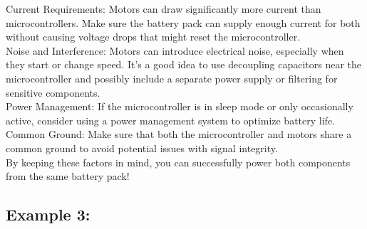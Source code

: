 \noindent Current Requirements: Motors can draw significantly more current than microcontrollers. Make sure the battery pack can supply enough current for both without causing voltage drops that might reset the microcontroller.\\

\noindent Noise and Interference: Motors can introduce electrical noise, especially when they start or change speed. It’s a good idea to use decoupling capacitors near the microcontroller and possibly include a separate power supply or filtering for sensitive components.\\

\noindent Power Management: If the microcontroller is in sleep mode or only occasionally active, consider using a power management system to optimize battery life.\\

\noindent Common Ground: Make sure that both the microcontroller and motors share a common ground to avoid potential issues with signal integrity.\\

\noindent By keeping these factors in mind, you can successfully power both components from the same battery pack!
\subsection{Example 3: }